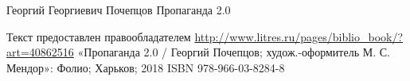  
 
 
 
 

Георгий Георгиевич Почепцов 
Пропаганда 2.0

Текст предоставлен правообладателем \url{http://www.litres.ru/pages/biblio_book/?art=40862516}
«Пропаганда 2.0 / Георгий Почепцов; худож.-оформитель М. С. Мендор»: Фолио; Харьков; 2018
ISBN 978-966-03-8284-8




